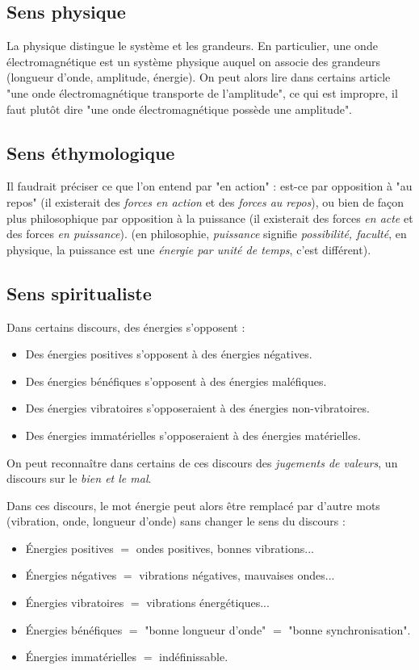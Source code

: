 \subsection{Sens physique}
La physique distingue le système et les grandeurs. En particulier, une onde électromagnétique est un système physique auquel on associe des grandeurs (longueur d'onde, amplitude, énergie). On peut alors lire dans certains article "une onde électromagnétique transporte de l'amplitude", ce qui est impropre, il faut plutôt dire "une onde électromagnétique possède une amplitude".

\subsection{Sens éthymologique}
Il faudrait préciser ce que l'on entend par "en action" : est-ce par opposition à "au repos" (il existerait des {\it forces en action} et des {\it forces au repos}), ou bien de façon plus philosophique par opposition à la puissance (il existerait des forces {\it en acte} et des forces {\it en puissance}). (en philosophie, {\it puissance} signifie {\it possibilité, faculté}, en physique, la puissance est une {\it énergie par unité de temps}, c'est différent).

\subsection{Sens spiritualiste}
Dans certains discours, des énergies s'opposent :
\begin{itemize}[leftmargin=1cm, label=, itemsep=1pt]
\item Des énergies positives s'opposent à des énergies négatives.
\item Des énergies bénéfiques s'opposent à des énergies maléfiques.
\item Des énergies vibratoires s'opposeraient à des énergies non-vibratoires.
\item Des énergies immatérielles s'opposeraient à des énergies matérielles.
\end{itemize}
On peut reconnaître dans certains de ces discours des {\it jugements de valeurs}, un discours sur le {\it bien et le mal}.

Dans ces discours, le mot énergie peut alors être remplacé par d'autre mots (vibration, onde, longueur d'onde) sans changer le sens du discours :
\begin{itemize}[leftmargin=1cm, label=, itemsep=1pt]
\item Énergies positives $=$ ondes positives, bonnes vibrations...
\item Énergies négatives $=$ vibrations négatives, mauvaises ondes...
\item Énergies vibratoires $=$ vibrations énergétiques...
\item Énergies bénéfiques $=$ "bonne longueur d'onde" $=$ "bonne synchronisation".
\item Énergies immatérielles $=$ indéfinissable.
\end{itemize}
